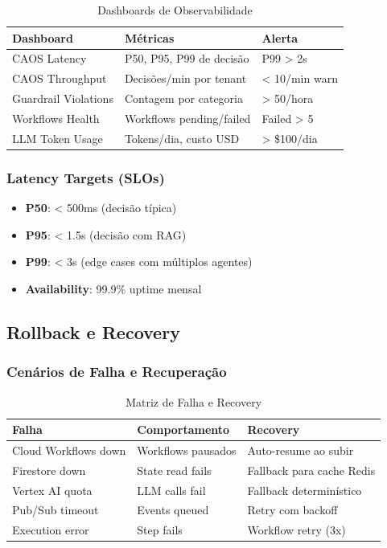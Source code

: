 \documentclass[12pt, a4paper]{article}
\begin{document}
\begin{table}[h!]
\centering
\small
\begin{tabular}{|l|l|l|}
\hline
\textbf{Dashboard} & \textbf{Métricas} & \textbf{Alerta} \\ \hline
CAOS Latency & P50, P95, P99 de decisão & P99 > 2s \\ \hline
CAOS Throughput & Decisões/min por tenant & < 10/min warn \\ \hline
Guardrail Violations & Contagem por categoria & > 50/hora \\ \hline
Workflows Health & Workflows pending/failed & Failed > 5 \\ \hline
LLM Token Usage & Tokens/dia, custo USD & > \$100/dia \\ \hline
\end{tabular}
\caption{Dashboards de Observabilidade}
\end{table}

\subsubsection{Latency Targets (SLOs)}

\begin{itemize}
    \item \textbf{P50}: < 500ms (decisão típica)
    \item \textbf{P95}: < 1.5s (decisão com RAG)
    \item \textbf{P99}: < 3s (edge cases com múltiplos agentes)
    \item \textbf{Availability}: 99.9\% uptime mensal
\end{itemize}

\subsection{Rollback e Recovery}

\subsubsection{Cenários de Falha e Recuperação}

\begin{table}[h!]
\centering
\small
\begin{tabular}{|l|l|l|}
\hline
\textbf{Falha} & \textbf{Comportamento} & \textbf{Recovery} \\ \hline
Cloud Workflows down & Workflows pausados & Auto-resume ao subir \\ \hline
Firestore down & State read fails & Fallback para cache Redis \\ \hline
Vertex AI quota & LLM calls fail & Fallback determinístico \\ \hline
Pub/Sub timeout & Events queued & Retry com backoff \\ \hline
Execution error & Step fails & Workflow retry (3x) \\ \hline
\end{tabular}
\caption{Matriz de Falha e Recovery}
\end{table}
\end{document}
